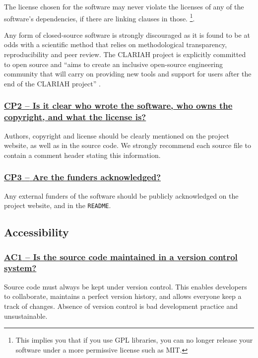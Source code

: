 \documentclass[a4paper,11pt]{article}
\newcommand{\indicator}[1]{\subsubsection*{\underline{#1}}}
\begin{document}
The license chosen for the software may never violate the licenses of any of
the software's dependencies, if there are linking clauses in those. \footnote{This implies you that if you use GPL libraries, you can no longer release your software under a more permissive license such as MIT.}.

Any form of closed-source software is strongly discouraged as it is found to be
at odds with a scientific method that relies on methodological transparency,
reproducibility and peer review. The CLARIAH project is explicitly committed to
open source and ``aims to create an inclusive open-source engineering community
that will carry on providing new tools and support for users after the end of
the CLARIAH project'' \citep{CLARIAHTECHPLAN1}.

\newcommand{\cpTwoName}{CP2}
\newcommand{\cpTwoID}{\cpTwoName}
\newcommand{\cpTwoText}{Is it clear who wrote the software, who owns the
copyright, and what the license is?}
\indicator{\cpTwoName{ }--{ }\cpTwoText}\label{id:cp2} 

Authors, copyright and license should be clearly mentioned on the project
website, as well as in the source code.  We strongly recommend each source file to contain a comment header stating this information.

\newcommand{\cpThreeName}{CP3}
\newcommand{\cpThreeID}{\cpThreeName}
\newcommand{\cpThreeText}{Are the funders acknowledged?}
\indicator{\cpThreeName{ }--{ }\cpThreeText}\label{id:cp3} 

Any external funders of the software should be publicly acknowledged on the project
website, and in the \texttt{README}.

\subsection{Accessibility}\label{sec:acc}

\newcommand{\acOneName}{AC1}
\newcommand{\acOneID}{\acOneName}
\newcommand{\acOneText}{Is the source code maintained in a version control system?}
\indicator{\acOneName{ }--{ }\acOneText}\label{id:ac1} 

Source code must always be kept under version control. This enables developers
to collaborate, maintains a perfect version history, and allows everyone keep a
track of changes. Absence of version control is bad development practice and
unsustainable.
\end{document}
